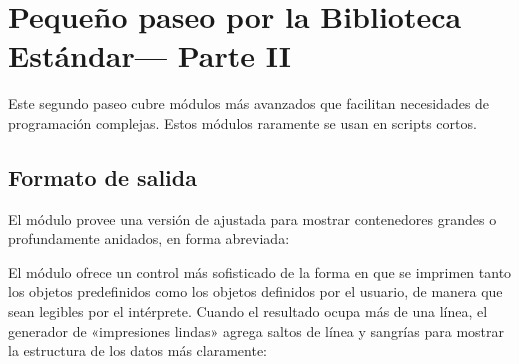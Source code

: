\documentclass[a4,10pt,spanish]{sphinxmanual}
\begin{document}
\chapter{Pequeño paseo por la Biblioteca Estándar— Parte II}
\label{\detokenize{tutorial/stdlib2:brief-tour-of-the-standard-library-part-ii}}\label{\detokenize{tutorial/stdlib2:tut-brieftourtwo}}\label{\detokenize{tutorial/stdlib2::doc}}
\sphinxAtStartPar
Este segundo paseo cubre módulos más avanzados que facilitan necesidades de programación complejas.  Estos módulos raramente se usan en scripts cortos.


\section{Formato de salida}
\label{\detokenize{tutorial/stdlib2:output-formatting}}\label{\detokenize{tutorial/stdlib2:tut-output-formatting}}
\sphinxAtStartPar
El módulo  provee una versión de  ajustada para mostrar contenedores grandes o profundamente anidados, en forma abreviada:

\begin{sphinxVerbatim}[commandchars=\\\{\}]
 
\end{sphinxVerbatim}

\sphinxAtStartPar
El módulo  ofrece un control más sofisticado de la forma en que se imprimen tanto los objetos predefinidos como los objetos definidos por el usuario, de manera que sean legibles por el intérprete. Cuando el resultado ocupa más de una línea, el generador de «impresiones lindas» agrega saltos de línea y sangrías para mostrar la estructura de los datos más claramente:
\end{document}
